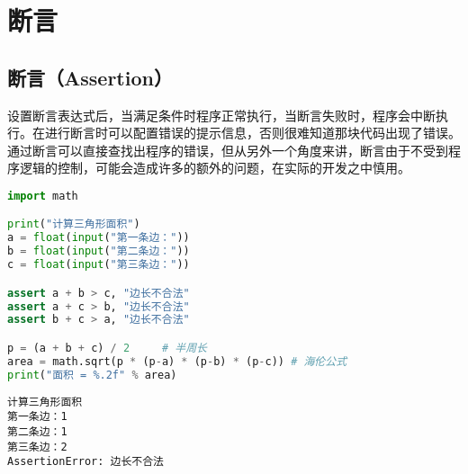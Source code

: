 \newpage

\section{断言}

\subsection{断言（Assertion）}

设置断言表达式后，当满足条件时程序正常执行，当断言失败时，程序会中断执行。在进行断言时可以配置错误的提示信息，否则很难知道那块代码出现了错误。\\

通过断言可以直接查找出程序的错误，但从另外一个角度来讲，断言由于不受到程序逻辑的控制，可能会造成许多的额外的问题，在实际的开发之中慎用。\\


\begin{lstlisting}[language=Python]
import math

print("计算三角形面积")
a = float(input("第一条边："))
b = float(input("第二条边："))
c = float(input("第三条边："))

assert a + b > c, "边长不合法"
assert a + c > b, "边长不合法"
assert b + c > a, "边长不合法"

p = (a + b + c) / 2     # 半周长
area = math.sqrt(p * (p-a) * (p-b) * (p-c)) # 海伦公式
print("面积 = %.2f" % area)
\end{lstlisting}

\begin{tcolorbox}
    \begin{verbatim}
计算三角形面积
第一条边：1
第二条边：1
第三条边：2
AssertionError: 边长不合法
	\end{verbatim}
\end{tcolorbox}

\newpage